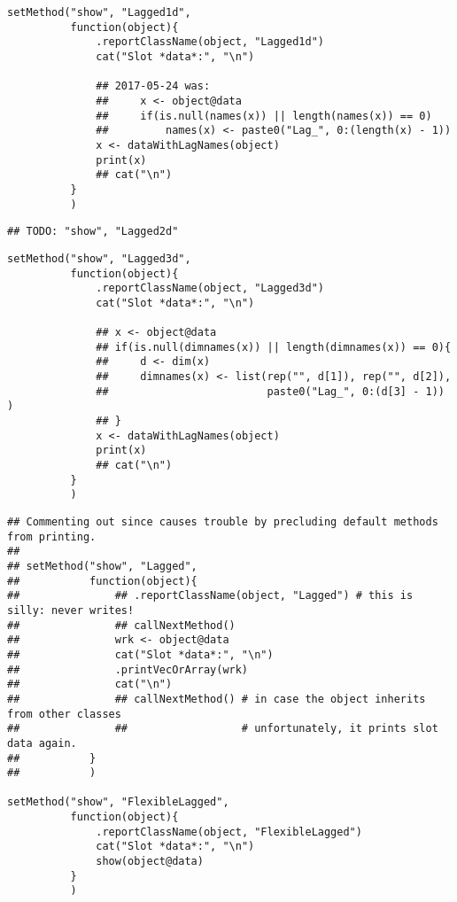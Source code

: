 \documentclass[11pt,a4paper]{article}
\begin{document}
\begin{verbatim}
setMethod("show", "Lagged1d",
          function(object){
              .reportClassName(object, "Lagged1d")
              cat("Slot *data*:", "\n")

              ## 2017-05-24 was:
              ##     x <- object@data
              ##     if(is.null(names(x)) || length(names(x)) == 0)
              ##         names(x) <- paste0("Lag_", 0:(length(x) - 1))
              x <- dataWithLagNames(object)
              print(x)
              ## cat("\n")
          }
          )
\end{verbatim}

\begin{verbatim}
## TODO: "show", "Lagged2d"
\end{verbatim}


\begin{verbatim}
setMethod("show", "Lagged3d",
          function(object){
              .reportClassName(object, "Lagged3d")
              cat("Slot *data*:", "\n")

              ## x <- object@data
              ## if(is.null(dimnames(x)) || length(dimnames(x)) == 0){
              ##     d <- dim(x)
              ##     dimnames(x) <- list(rep("", d[1]), rep("", d[2]),
              ##                         paste0("Lag_", 0:(d[3] - 1)) )
              ## }
              x <- dataWithLagNames(object)
              print(x)
              ## cat("\n")
          }
          )
\end{verbatim}

\begin{verbatim}
## Commenting out since causes trouble by precluding default methods from printing.
##
## setMethod("show", "Lagged",
##           function(object){
##               ## .reportClassName(object, "Lagged") # this is silly: never writes!
##               ## callNextMethod()
##               wrk <- object@data
##               cat("Slot *data*:", "\n")
##               .printVecOrArray(wrk)
##               cat("\n")
##               ## callNextMethod() # in case the object inherits from other classes
##               ##                  # unfortunately, it prints slot data again.
##           }
##           )

setMethod("show", "FlexibleLagged",
          function(object){
              .reportClassName(object, "FlexibleLagged")
              cat("Slot *data*:", "\n")
              show(object@data)
          }
          )
\end{verbatim}
\end{document}
